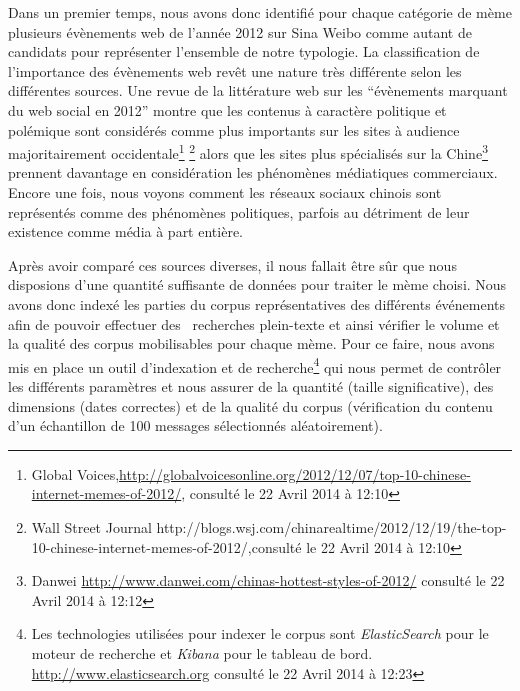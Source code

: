 Dans un premier temps, nous avons donc identifié pour chaque catégorie de mème plusieurs évènements web de l{\textquoteright}année 2012 sur Sina Weibo comme autant de candidats pour représenter l{\textquoteright}ensemble de notre typologie. La classification de l{\textquoteright}importance des évènements web rev\^et une nature très différente selon les différentes sources. Une revue de la littérature web sur les {\textquotedblleft}évènements marquant du web social en 2012{\textquotedblright} montre que les contenus à caractère politique et polémique sont considérés comme plus importants sur les sites à audience majoritairement occidentale\footnote{Global Voices,\url{http://globalvoicesonline.org/2012/12/07/top-10-chinese-internet-memes-of-2012/}, consulté le 22 Avril 2014 à 12:10} \footnote{ Wall Street Journal http://blogs.wsj.com/chinarealtime/2012/12/19/the-top-10-chinese-internet-memes-of-2012/,consulté le 22 Avril 2014 à 12:10 } alors que les sites plus spécialisés sur la Chine\footnote{ Danwei \url{http://www.danwei.com/chinas-hottest-styles-of-2012/} consulté le 22 Avril 2014 à 12:12} prennent davantage en considération les phénomènes médiatiques commerciaux. Encore une fois, nous voyons comment les réseaux sociaux chinois sont représentés comme des phénomènes politiques, parfois au détriment de leur existence comme média à part entière. 

Après avoir comparé ces sources diverses, il nous fallait \^etre s\^ur que nous disposions d{\textquoteright}une quantité suffisante de données pour traiter le mème choisi. Nous avons donc indexé les parties du corpus représentatives des différents événements afin de pouvoir effectuer des \ recherches plein-texte et ainsi vérifier le volume et la qualité des corpus mobilisables pour chaque mème. Pour ce faire, nous avons mis en place un outil d{\textquoteright}indexation et de recherche\footnote{ Les technologies utilisées pour indexer le corpus sont \textit{ElasticSearch }pour le moteur de recherche et \textit{Kibana} pour le tableau de bord. \url{http://www.elasticsearch.org} consulté le 22 Avril 2014 à 12:23} qui nous permet de contr\^oler les différents paramètres et nous assurer de la quantité (taille significative), des dimensions (dates correctes) et de la qualité du corpus (vérification du contenu d{\textquoteright}un échantillon de 100 messages sélectionnés aléatoirement). 

